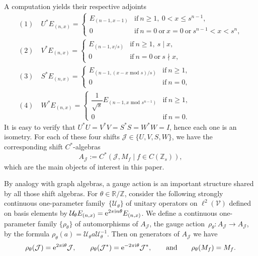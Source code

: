 \documentclass[10pt,a4paper]{amsart}
\newcommand{\R}{{\mathbb R}}
\newcommand{\Z}{{\mathbb Z}}
\numberwithin{equation}{section}
\begin{document}
A computation yields their respective adjoints
\begin{gather*}
(1) \quad U^*E_{(n,x)} =
\begin{cases}
E_{(n-1, x-1)} &\textrm{if}\ n\ge1,\ 0<x\le s^{n-1} ,\\
0 &\textrm{if}\ n=0 \ \textrm{or}\ x=0\ \textrm{or}\ s^{n-1}<x<s^n,
\end{cases}
\\
(2) \quad
V^*E_{(n,x)} =
\begin{cases}
E_{(n-1, x/s)} &\textrm{if}\ n\ge1,\ s\mid x,\\
0 &\textrm{if}\ n=0\ \textrm{or}\ s\nmid x,
\end{cases}\\
(3)\quad
S^*E_{(n,x)} =
\begin{cases}
E_{(n-1, (x-x\textrm{ mod }s)/s)} &\textrm{if}\ n\ge1,\\
0&\textrm{if}\ n=0,
\end{cases}\\
(4) \quad
W^*E_{(n,x)} =
\begin{cases}
\dfrac{1}{\sqrt{s}}E_{(n-1, x\textrm{ mod }s^{n-1})} &\textrm{if}\ n\ge1,\\
0&\textrm{if}\ n=0.
\end{cases}
\end{gather*}
It is easy to verify that
$U^*U=V^*V=S^*S=W^*W=I$,
hence each one is an isometry. For each of these four shifts $\mathcal{J}\in\{U, V, S, W\}$, we have the corresponding shift $C^*$-algebras
\begin{equation*}
A_{\mathcal{J}} := C^*(\mathcal{J},M_f \mid f\in C(\Z_s)) ,
\end{equation*}
which are the main objects of interest in this paper.

By analogy with graph algebras, a gauge action is an important structure shared by all those shift algebras. For $\theta\in\R/\Z$, consider the following strongly continuous one-parameter family~$\{\mathcal{U}_\theta\}$ of unitary operators on $\ell^2(\mathcal{V})$ defined on basis elements by
$
\mathcal{U}_\theta E_{(n,x)}={\rm e}^{2\pi {\rm i}n\theta}E_{(n,x)}$.
We define a continuous one-parameter family $\{\rho_\theta\}$ of automorphisms of $A_{\mathcal{J}}$, the gauge action~${\rho_\theta\colon A_{\mathcal{J}}\to A_{\mathcal{J}}}$, by the formula
$\rho_\theta(a)=\mathcal{U}_\theta a \mathcal{U}_\theta^{-1}$.
Then on generators of $A_{\mathcal{J}}$ we have
\begin{equation*}
\rho_\theta(\mathcal{J})={\rm e}^{2\pi {\rm i}\theta}\mathcal{J} ,\qquad \rho_\theta(\mathcal{J}^*)={\rm e}^{-2\pi {\rm i}\theta}\mathcal{J}^* ,\qquad\textrm{and}\qquad \rho_\theta(M_f) = M_f .
\end{equation*}
\end{document}
